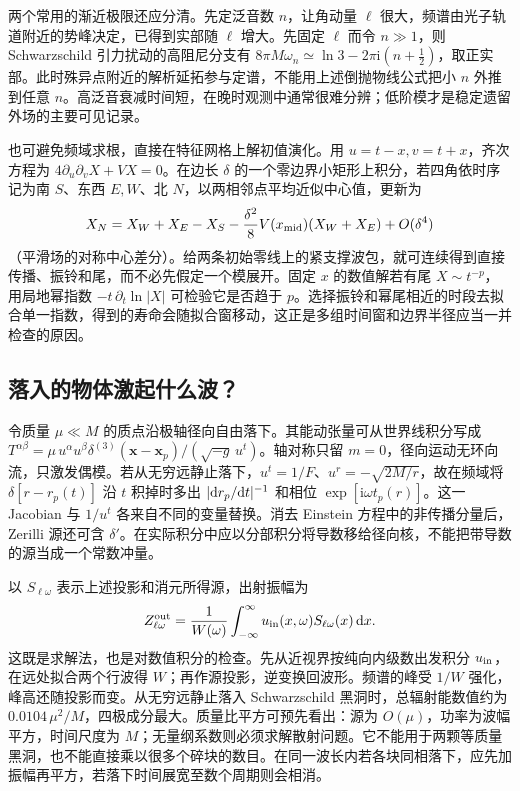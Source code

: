 两个常用的渐近极限还应分清。先定泛音数 $n$，让角动量 $\ell$ 很大，频谱由光子轨道附近的势峰决定，已得到实部随 $\ell$ 增大。先固定 $\ell$ 而令 $n\gg1$，则 Schwarzschild 引力扰动的高阻尼分支有 $8\pi M\omega_n\simeq\ln3-2\pi\mathrm i(n+\tfrac12)$，取正实部。此时殊异点附近的解析延拓参与定谱，不能用上述倒抛物线公式把小 $n$ 外推到任意 $n$。高泛音衰减时间短，在晚时观测中通常很难分辨；低阶模才是稳定遗留外场的主要可见记录。

也可避免频域求根，直接在特征网格上解初值演化。用 $u=t-x,v=t+x$，齐次方程为 $4\partial_u\partial_vX+VX=0$。在边长 $\delta$ 的一个零边界小矩形上积分，若四角依时序记为南 $S$、东西 $E,W$、北 $N$，以两相邻点平均近似中心值，更新为
\[
 X_N=X_W+X_E-X_S-\frac{\delta^2}{8}V(x_{\rm mid})(X_W+X_E)
       +O(\delta^4)
\]
（平滑场的对称中心差分）。给两条初始零线上的紧支撑波包，就可连续得到直接传播、振铃和尾，而不必先假定一个模展开。固定 $x$ 的数值解若有尾 $X\sim t^{-p}$，用局地幂指数 $-t\,\partial_t\ln|X|$ 可检验它是否趋于 $p$。选择振铃和幂尾相近的时段去拟合单一指数，得到的寿命会随拟合窗移动，这正是多组时间窗和边界半径应当一并检查的原因。

\subsection{落入的物体激起什么波？}

令质量 $\mu\ll M$ 的质点沿极轴径向自由落下。其能动张量可从世界线积分写成 $T^{\alpha\beta}=\mu\,u^\alpha u^\beta\delta^{(3)}(\bm x-\bm x_p)/(\sqrt{-g}\,u^t)$。轴对称只留 $m=0$，径向运动无环向流，只激发偶模。若从无穷远静止落下，$u^t=1/F$、$u^r=-\sqrt{2M/r}$，故在频域将 $\delta[r-r_p(t)]$ 沿 $t$ 积掉时多出 $|\dd r_p/\dd t|^{-1}$ 和相位 $\exp[\mathrm i\omega t_p(r)]$。这一 Jacobian 与 $1/u^t$ 各来自不同的变量替换。消去 Einstein 方程中的非传播分量后，Zerilli 源还可含 $\delta'$。在实际积分中应以分部积分将导数移给径向核，不能把带导数的源当成一个常数冲量。

以 $S_{\ell\omega}$ 表示上述投影和消元所得源，出射振幅为
\[
 Z_{\ell\omega}^{\rm out}=\frac{1}{W(\omega)}
       \int_{-\infty}^{\infty}u_{\rm in}(x,\omega)S_{\ell\omega}(x)\,\dd x .
\]
这既是求解法，也是对数值积分的检查。先从近视界按纯向内级数出发积分 $u_{\rm in}$，在远处拟合两个行波得 $W$；再作源投影，逆变换回波形。频谱的峰受 $1/W$ 强化，峰高还随投影而变。从无穷远静止落入 Schwarzschild 黑洞时，总辐射能数值约为 $0.0104\,\mu^2/M$，四极成分最大。质量比平方可预先看出：源为 $O(\mu)$，功率为波幅平方，时间尺度为 $M$；无量纲系数则必须求解散射问题。它不能用于两颗等质量黑洞，也不能直接乘以很多个碎块的数目。在同一波长内若各块同相落下，应先加振幅再平方，若落下时间展宽至数个周期则会相消。



